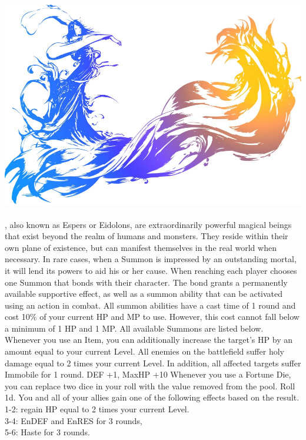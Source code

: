 %
\\\\
%
\includegraphics[width=\columnwidth]{./art/images/ff10.jpg}\\\\
%
, also known as Espers or Eidolons, are extraordinarily powerful magical beings that exist beyond the realm of humans and monsters.
They reside within their own plane of existence, but can manifest themselves in the real world when necessary.
In rare cases, when a Summon is impressed by an outstanding mortal, it will lend its powers to aid his or her cause.
When reaching  each player chooses one Summon that bonds with their character.
The bond grants a permanently available supportive effect, as well as a summon ability that can be activated using an action in combat. 
All summon abilities have a cast time of 1 round and cost 10\% of your current HP and MP to use.
However, this cost cannot fall below a minimum of 1 HP and 1 MP.
All available Summons are listed below.
%
\vfill
%
{Whenever you use an Item, you can additionally increase the target's HP by an amount equal to your current Level.}
{All enemies on the battlefield suffer holy damage equal to 2 times your current Level. In addition, all affected targets suffer Immobile for 1 round.}
{DEF +1, MaxHP +10}
%
\vfill
%
{Whenever you use a Fortune Die, you can replace two dice in your roll with the value removed from the pool.}
{Roll 1d. You and all of your allies gain one of the following effects based on the result.\\ 1-2: regain HP equal to 2 times your current Level.\\ 3-4: EnDEF and EnRES for 3 rounds,\\ 5-6: Haste for 3 rounds.}
